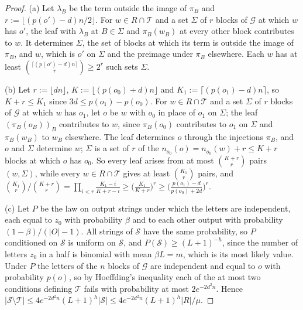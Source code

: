 \documentclass[11pt]{article}
\theoremstyle{definition}
\theoremstyle{remark}
\begin{document}
\begin{proof}
(a) Let $\lambda_B$ be the term outside the image of $\pi_B$ and $r:=\lfloor(p(o')-d)n/2\rfloor$. For $w\in R\cap \mathcal T$ and a set $\Sigma$ of $r$ blocks of $\mathcal G$ at which $w$ has $o'$, the leaf with $\lambda_B$ at $B\in\Sigma$ and $\pi_B(w_B)$ at every other block contributes to $w$. It determines $\Sigma$, the set of blocks at which its term is outside the image of $\pi_B$, and $w$, which is $o'$ on $\Sigma$ and the preimage under $\pi_B$ elsewhere. Each $w$ has at least $\binom{\lceil(p(o')-d)n\rceil}r\ge2^r$ such sets $\Sigma$.

(b) Let $r:=\lfloor dn\rfloor$, $K:=\lfloor(p(o_0)+d)n\rfloor$ and $K_1:=\lceil(p(o_1)-d)n\rceil$, so $K+r\le K_1$ since $3d\le p(o_1)-p(o_0)$. For $w\in R\cap \mathcal T$ and a set $\Sigma$ of $r$ blocks of $\mathcal G$ at which $w$ has $o_1$, let $o$ be $w$ with $o_0$ in place of $o_1$ on $\Sigma$; the leaf $(\pi_B(o_B))_B$ contributes to $w$, since $\pi_B(o_0)$ contributes to $o_1$ on $\Sigma$ and $\pi_B(w_B)$ to $w_B$ elsewhere. The leaf determines $o$ through the injections $\pi_B$, and $o$ and $\Sigma$ determine $w$; $\Sigma$ is a set of $r$ of the $n_{o_0}(o)=n_{o_0}(w)+r\le K+r$ blocks at which $o$ has $o_0$. So every leaf arises from at most $\binom{K+r}r$ pairs $(w,\Sigma)$, while every $w\in R\cap \mathcal T$ gives at least $\binom{K_1}r$ pairs, and $\binom{K_1}r/\binom{K+r}r=\prod_{i<r}\frac{K_1-i}{K+r-i}\ge\big(\frac{K_1}{K+r}\big)^r\ge\big(\frac{p(o_1)-d}{p(o_0)+2d}\big)^r$.

(c) Let $P$ be the law on output strings under which the letters are independent, each equal to $z_0$ with probability $\beta$ and to each other output with probability $(1-\beta)/(|O|-1)$. All strings of $\mathcal S$ have the same probability, so $P$ conditioned on $\mathcal S$ is uniform on $\mathcal S$, and $P(\mathcal S)\ge(L+1)^{-h}$, since the number of letters $z_0$ in a half is binomial with mean $\beta L=m$, which is its most likely value. Under $P$ the letters of the $n$ blocks of $\mathcal G$ are independent and equal to $o$ with probability $p(o)$, so by Hoeffding's inequality each of the at most two conditions defining $\mathcal T$ fails with probability at most $2e^{-2d^2n}$. Hence $|\mathcal S\setminus \mathcal T|\le4e^{-2d^2n}(L+1)^h|\mathcal S|\le4e^{-2d^2n}(L+1)^h|R|/\mu$.
\end{proof}
\end{document}
